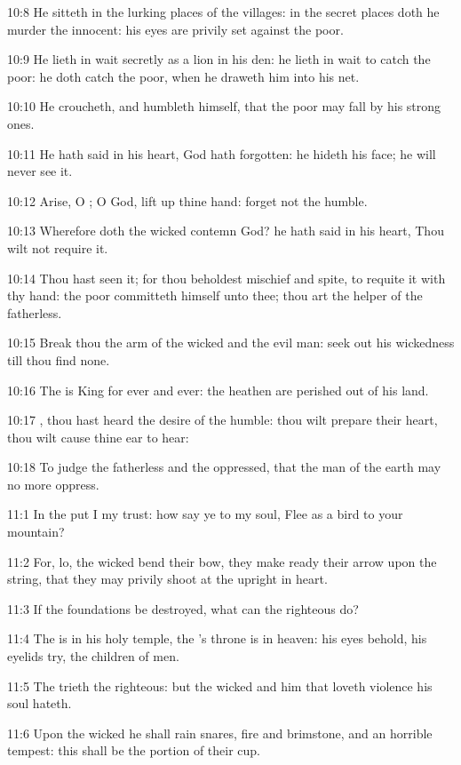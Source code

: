 10:8 He sitteth in the lurking places of the villages: in the secret
places doth he murder the innocent: his eyes are privily set against
the poor.

10:9 He lieth in wait secretly as a lion in his den: he lieth in wait
to catch the poor: he doth catch the poor, when he draweth him into
his net.

10:10 He croucheth, and humbleth himself, that the poor may fall by
his strong ones.

10:11 He hath said in his heart, God hath forgotten: he hideth his
face; he will never see it.

10:12 Arise, O \LORD; O God, lift up thine hand: forget not the humble.

10:13 Wherefore doth the wicked contemn God? he hath said in his
heart, Thou wilt not require it.

10:14 Thou hast seen it; for thou beholdest mischief and spite, to
requite it with thy hand: the poor committeth himself unto thee; thou
art the helper of the fatherless.

10:15 Break thou the arm of the wicked and the evil man: seek out his
wickedness till thou find none.

10:16 The \LORD is King for ever and ever: the heathen are perished out
of his land.

10:17 \LORD, thou hast heard the desire of the humble: thou wilt
prepare their heart, thou wilt cause thine ear to hear:

10:18 To judge the fatherless and the oppressed, that the man of the
earth may no more oppress.



11:1 In the \LORD put I my trust: how say ye to my soul, Flee as a bird
to your mountain?

11:2 For, lo, the wicked bend their bow, they make ready their arrow
upon the string, that they may privily shoot at the upright in heart.

11:3 If the foundations be destroyed, what can the righteous do?

11:4 The \LORD is in his holy temple, the \LORD's throne is in heaven:
his eyes behold, his eyelids try, the children of men.

11:5 The \LORD trieth the righteous: but the wicked and him that loveth
violence his soul hateth.

11:6 Upon the wicked he shall rain snares, fire and brimstone, and an
horrible tempest: this shall be the portion of their cup.

